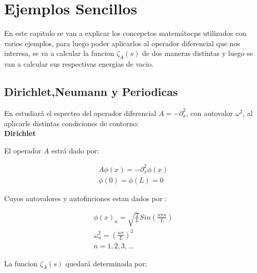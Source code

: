 \chapter{Ejemplos Sencillos}

    
    En este capitulo se van a explicar los concepctos matemátocps utilizados con varios ejemplos, para luego poder aplicarlos al operador diferencial que nos interesa, se va a calcular la funcion $ \zeta _A (s) $ de dos maneras distintas y luego se van a calcular sus respectivas energías de vacio.

\section{Dirichlet,Neumann y Periodicas}

En estudiará el espectro del operador diferencial $A = - \partial ^2 _x$, con autovalor $\omega ^2$, al aplicarle distintas condiciones de contorno: \\

\textbf{Dirichlet}

El operador $A$ estrá dado por:

\begin{equation}
\begin{array}{c}
	A \phi (x) = - \partial _x ^2 \phi (x) \\
    \phi (0) = \phi(L) = 0 
\end{array}
\end{equation}



Cuyos autovalores y autofinciones estan dados por  : 

\begin{equation}
\begin{array}{c}
	\phi (x) _n = \sqrt{\frac{2}{L}} Sin( \frac{n \pi x}{L} ) \\
	\omega _n ^2 = \left( \frac{n \pi }{L} \right) ^2 \\
	n = 1,2,3, ...
\end{array}
\end{equation}

La funcion $\zeta _A (s)$ quedará determinada por:

